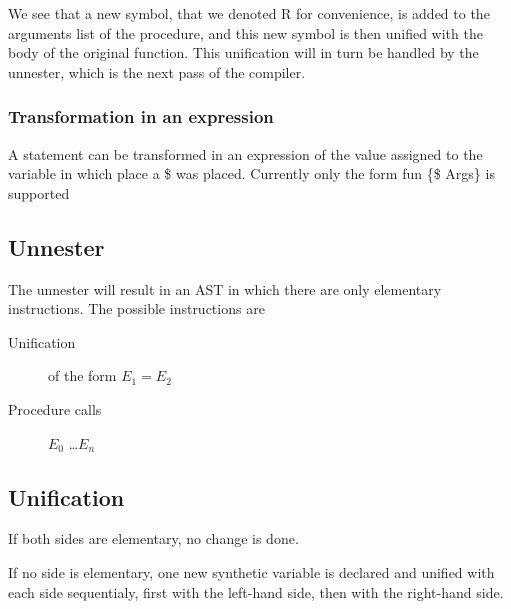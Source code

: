 \documentclass[a4paper]{memoir}
\begin{document}
We see that a new symbol, that we denoted R for convenience, is added to the arguments list of the procedure, and this new symbol is then unified with the body of the original function. This unification will in turn be handled by the unnester, which is the next pass of the compiler.

\subsubsection{Transformation in an expression}
A statement can be transformed in an expression of the value assigned to the variable in which place a \$ was placed.
Currently only the form fun \{\$ Args\} is supported
\subsection{Unnester}            
The unnester will result in an AST in which there are only elementary instructions. The possible instructions are
\begin{description}
  \item[Unification] of the form $E_1=E_2$
  \item[Procedure calls] {$E_0$ \ldots $E_n$} 
\end{description}
\subsection{Unification}
If both sides are elementary, no change is done.

If no side is elementary, one new synthetic variable is declared and unified with each side sequentialy, first with the left-hand side, then with the right-hand side. 
\end{document}
